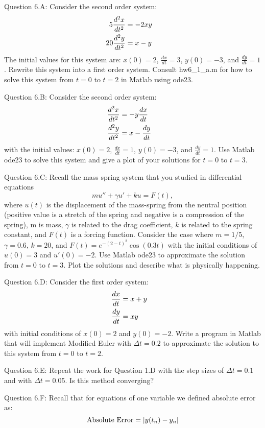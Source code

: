 \documentclass{article}
\def\ds{\displaystyle}
\begin{document}
%
Question 6.A: Consider the second order system:
\begin{align*}
    5\frac {d^2x}{dt^2} &= -2xy  \cr 
    20 \frac {d^2y}{dt^2} &= x-y
\end{align*}
The initial values for this system are: $x(0)=2$, $\ds \frac {dx}{dt}=3$, $y(0)= -3$, and $\ds \frac {dy}{dt}=1$. Rewrite this system into a first order system. Consult hw6\_1\_a.m for how to solve this system from $t=0$ to $t=2$ in Matlab using ode23. 
\par \medskip \noindent 
%
Question 6.B: Consider the second order system:
\begin{align*}
    \frac {d^2x}{dt^2} &= -y\frac {dx}{dt}  \cr 
    \frac {d^2y}{dt^2} &= x-\frac {dy}{dt}
\end{align*}
with the initial values: $x(0)=2$, $\ds \frac {dx}{dt}=1$, $y(0)= -3$, and $\ds \frac {dy}{dt}=1$. Use Matlab ode23 to solve this system and give a plot of your solutions for $t=0$ to $t=3$. 
\par \medskip \noindent 
%
Question 6.C: Recall the mass spring system that you studied in differential equations
$$mu''+\gamma u' + ku = F(t),$$
where $u(t)$ is the displacement of the mass-spring from the neutral position (positive value is a stretch of the spring and negative is a compression of the spring), m is mass, $\gamma$ is related to the drag coefficient, $k$ is related to the spring constant, and $F(t)$ is a forcing function. Consider the case where $m=1/5$, $\gamma = 0.6$, $k=20$, and $\ds F(t) = e^{-(2-t)^2} \cos(0.3t)$ with the initial conditions of $u(0)=3$ and $u'(0)= -2$. Use Matlab ode23 to approximate the solution from $t=0$ to $t=3$. Plot the solutions and describe what is physically happening. 
\par \medskip \noindent 
%
Question 6.D: Consider the first order system:
\begin{align*}
    \frac {dx}{dt} &= x+y  \cr 
    \frac {dy}{dt} &= xy
\end{align*}
with initial conditions of $x(0)=2$ and $y(0)=-2$. Write a program in Matlab that will implement Modified Euler with $\Delta t = 0.2$ to approximate the solution to this system from $t=0$ to $t=2$. 
\par \medskip \noindent 
%
Question 6.E: Repeat the work for Question 1.D with the step sizes of $\Delta t = 0.1$ and with $\Delta t = 0.05$. Is this method converging?
\par \medskip \noindent 
%
Question 6.F: Recall that for equations of one variable we defined absolute error as:
$${\rm Absolute \ Error}=\vert y(t_n)-y_n\vert$$
\end{document}
